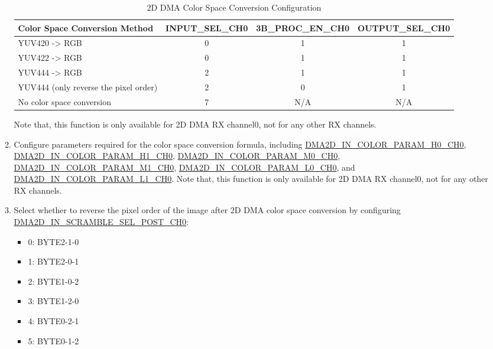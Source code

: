 \documentclass[main\_\_EN.tex]{subfiles}
\begin{document}
\begin{enumerate}
\begin{enumerate}
            \begin{longtable}{ | l | c | c | c | }
            \caption{2D DMA Color Space Conversion Configuration} \label{tab:de_csc}
            \\ \hline
            \rowcolor{lightgray}
            \textbf{Color Space Conversion Method} & \textbf{INPUT\_SEL\_CH0}  &  \textbf{3B\_PROC\_EN\_CH0} &  \textbf{OUTPUT\_SEL\_CH0}  \\ \hline
            YUV420 -> RGB &  0  &  1  &  1 \\ \hline
            YUV422 -> RGB &  0  &  1  &  1 \\ \hline
            YUV444 -> RGB &  2  &  1  &  1 \\ \hline
            YUV444 (only reverse the pixel order) &  2  &  0  &  1 \\ \hline
            No color space conversion &  7  &  N/A  &  N/A \\ \hline
            \end{longtable}
        Note that, this function is only available for 2D DMA RX channel0, not for any other RX channels.
        \item Configure parameters required for the color space conversion formula, including \hyperref[fielddesc:DMA2DINCOLORPARAMH0CH0]{DMA2D\_IN\_COLOR\_PARAM\_H0\_CH0}, \hyperref[fielddesc:DMA2DINCOLORPARAMH1CH0]{DMA2D\_IN\_COLOR\_PARAM\_H1\_CH0}, \hyperref[fielddesc:DMA2DINCOLORPARAMM0CH0]{DMA2D\_IN\_COLOR\_PARAM\_M0\_CH0}, \hyperref[fielddesc:DMA2DINCOLORPARAMM1CH0]{DMA2D\_IN\_COLOR\_PARAM\_M1\_CH0}, \hyperref[fielddesc:DMA2DINCOLORPARAML0CH0]{DMA2D\_IN\_COLOR\_PARAM\_L0\_CH0}, and \hyperref[fielddesc:DMA2DINCOLORPARAML1CH0]{DMA2D\_IN\_COLOR\_PARAM\_L1\_CH0}. Note that, this function is only available for 2D DMA RX channel0, not for any other RX channels.
        \item Select whether to reverse the pixel order of the image after 2D DMA color space conversion by configuring \hyperref[fielddesc:DMA2DINSCRAMBLESELPOSTCH0]{DMA2D\_IN\_SCRAMBLE\_SEL\_POST\_CH0}:
        \begin{itemize}
            \item 0: BYTE2-1-0
            \item 1: BYTE2-0-1
            \item 2: BYTE1-0-2
            \item 3: BYTE1-2-0
            \item 4: BYTE0-2-1
            \item 5: BYTE0-1-2
        \end{itemize}

\end{enumerate}
\end{enumerate}
\end{document}
